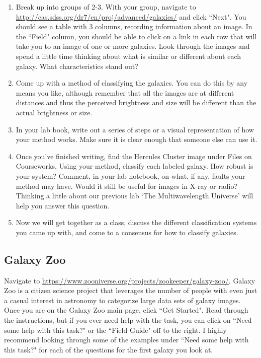 \documentclass[11pt]{article}
\begin{document}
\begin{enumerate}
    \item Break up into groups of 2-3.  With your group, navigate to \url{http://cas.sdss.org/dr7/en/proj/advanced/galaxies/} and click ``Next".  You should see a table with 3 columns, recording information about an image.  In the ``Field" column, you should be able to click on a link in each row that will take you to an image of one or more galaxies.  Look through the images and spend a little time thinking about what is similar or different about each galaxy.  What characteristics stand out?
    \item Come up with a method of classifying the galaxies.  You can do this by any means you like, although remember that all the images are at different distances and thus the perceived brightness and size will be different than the actual brightness or size.
    \item In your lab book, write out a series of steps or a visual representation of how your method works.  Make sure it is clear enough that someone else can use it.
    \item Once you've finished writing, find the Hercules Cluster image under Files on Courseworks.  Using your method, classify each labeled galaxy.  How robust is your system?  Comment, in your lab notebook, on what, if any, faults your method may have.  Would it still be useful for images in X-ray or radio?  Thinking a little about our previous lab `The Multiwavelength Universe' will help you answer this question.
    \item Now we will get together as a class, discuss the different classification systems you came up with, and come to a consensus for how to classify galaxies.
\end{enumerate}

\subsection{Galaxy Zoo}

Navigate to \url{https://www.zooniverse.org/projects/zookeeper/galaxy-zoo/}.  Galaxy Zoo is a citizen science project that leverages the number of people with even just a casual interest in astronomy to categorize large data sets of galaxy images.  Once you are on the Galaxy Zoo main page, click ``Get Started".  Read through the instructions, but if you ever need help with the task, you can click on ``Need some help with this task?" or the ``Field Guide" off to the right.  I highly recommend looking through some of the examples under ``Need some help with this task?" for each of the questions for the first galaxy you look at.
\end{document}
